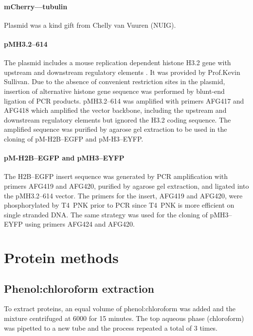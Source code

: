       \paragraph{mCherry--\textalpha--tubulin}
      Plasmid was a kind gift from Chelly van Vuuren (NUIG).

      \paragraph{pMH3.2--614}
      The plasmid includes a mouse replication dependent histone H3.2
      gene with upstream and downstream regulatory elements
      \citep{pMH3-plasmid}.  It was provided by Prof.\@ Kevin
      Sullivan.  Due to the absence of convenient restriction sites in
      the plasmid, insertion of alternative histone gene sequence was
      performed by blunt-end ligation of PCR products.  pMH3.2--614
      was amplified with primers AFG417 and AFG418 which amplified the
      vector backbone, including the upstream and downstream
      regulatory elements but ignored the H3.2 coding sequence.  The
      amplified sequence was purified by agarose gel extraction to be
      used in the cloning of pM-H2B--EGFP and pM-H3--EYFP.

      \paragraph{pM-H2B--EGFP and pMH3--EYFP}
      The H2B--EGFP insert sequence was generated by PCR amplification
      with primers AFG419 and AFG420, purified by agarose gel
      extraction, and ligated into the pMH3.2--614 vector.  The
      primers for the insert, AFG419 and AFG420, were phosphorylated
      by T4~PNK prior to PCR since T4~PNK is more efficient on single
      stranded DNA.
      The same strategy was used for the cloning of pMH3--EYFP using
      primers AFG424 and AFG420.

  \section{Protein methods}
    \subsection{Phenol:chloroform extraction}
      \label{sec:phenol-extraction}
      To extract proteins, an equal volume of phenol:chloroform was
      added and the mixture centrifuged at \SI{6000}{\gn} for 15 minutes.
      The top aqueous phase (chloroform) was pipetted to a new tube and
      the process repeated a total of 3 times.

